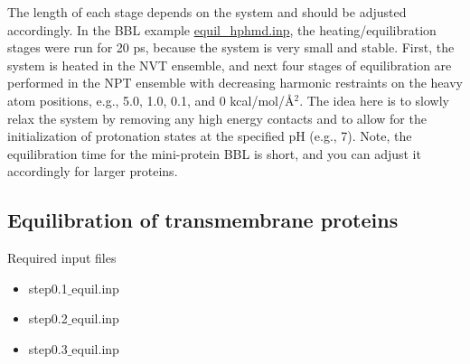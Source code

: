 The length of each stage depends on the system and should be adjusted accordingly.
In the BBL example \href{https://gitlab.com/shenlab-amber-cphmd/cphmd-tutorial/-/tree/main/hphmd_charmm/bbl_equil_prod}{equil\_hphmd.inp},
the heating/equilibration stages were run for 20 ps, 
because the system is very small and stable. 
First, the system is heated in the NVT ensemble, and next
four stages of equilibration are performed in the NPT ensemble with decreasing harmonic restraints on the heavy atom positions, e.g., 5.0, 1.0, 0.1, and 0 kcal/mol/{\AA}$^2$. 
The idea here is to slowly relax the system by removing any high energy contacts and to allow for the initialization of protonation states at the specified pH (e.g., 7).
Note, the equilibration time for the mini-protein BBL
is short, and you can adjust it accordingly for larger proteins.

\subsection{Equilibration of transmembrane proteins}

\begin{checklist}{Required input files}
\begin{itemize}
\item  step0.1$\_$equil.inp
\item  step0.2$\_$equil.inp
\item  step0.3$\_$equil.inp
\end{itemize}
\end{checklist}


